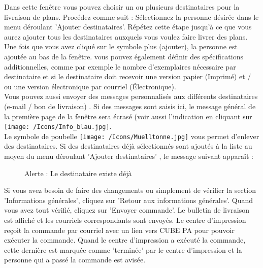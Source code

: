 Dans cette fenêtre vous pouvez choisir un ou plusieurs destinataires pour la livraison de plans. Procédez comme suit : Sélectionnez la personne désirée dans le menu déroulant 'Ajouter destinataires'. Répétez cette étape jusqu'à ce que vous aurez ajouter tous les destinataires auxquels vous voulez faire livrer des plans. Une fois que vous avez cliqué sur le symbole plus (ajouter), la personne est ajoutée au bas de la fenêtre. vous pouvez également définir des spécifications additionnelles, comme par exemple le nombre d'exemplaires nécessaire par destinataire et si le destinataire doit recevoir une version papier (Imprimé) et / ou une version électronique par courriel (Électronique). \\
Vous pouvez aussi envoyer des messages personnalisés aux différents destinataires (e-mail / bon de livraison) . Si des messages sont saisis ici, le message général de la première page de la fenêtre sera écrasé (voir aussi l'indication en cliquant sur \texttt{[image: /Icons/Info\_blau.jpg]}. \\
Le symbole de poubelle \texttt{[image: /Icons/Muelltonne.jpg]}  vous permet d'enlever des destinataires. Si des destinataires déjà sélectionnés sont ajoutés à la liste au moyen du menu déroulant 'Ajouter destinataires' , le message suivant apparaît :

\begin{figure}[H]
\caption{Alerte : Le destinataire existe déjà}
\end{figure}

\vspace{\baselineskip}

Si vous avez besoin de faire des changements ou simplement de vérifier la section 'Informations générales', cliquez sur 'Retour aux informations générales'. Quand vous avez tout vérifié, cliquez sur 'Envoyer commande'. Le bulletin de livraison est affiché et les courriels correspondants sont envoyés. Le centre d'impression reçoit la commande par courriel avec un lien vers CUBE PA pour pouvoir exécuter la commande. Quand le centre d'impression a exécuté la commande, cette dernière est marquée comme 'terminée' par le centre d'impression et la personne qui a passé la commande est avisée.

